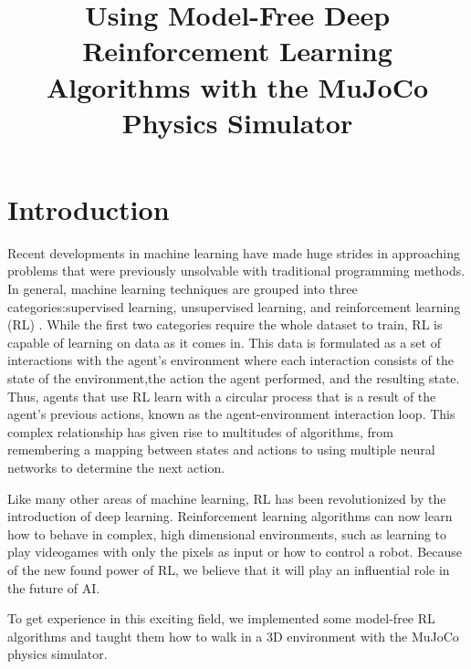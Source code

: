 \documentclass[conference]{IEEEtran}
\begin{document}
\title{Using Model-Free Deep Reinforcement Learning Algorithms with the MuJoCo Physics Simulator}

\author{
    \and
}
\maketitle

\begin{abstract}
    \blindtext
\end{abstract}

\section{Introduction}

Recent developments in machine learning have made huge strides in approaching problems that were previously unsolvable with traditional programming methods. In general, machine learning techniques are grouped into three categories:supervised learning, unsupervised learning, and reinforcement learning (RL) \cite{rl_application}. While the first two categories require the whole dataset to train, RL is capable of learning on data as it comes in. This data is formulated as a set of interactions with the agent's environment where each interaction consists of the state of the environment,the action the agent performed, and the resulting state. Thus, agents that use RL learn with a circular process that is a result of the agent's previous actions, known as the agent-environment interaction loop. This complex relationship has given rise to multitudes of algorithms, from remembering a mapping between states and actions to using multiple neural networks to determine the next action.

Like many other areas of machine learning, RL has been revolutionized by the introduction of deep learning. Reinforcement learning algorithms can now learn how to behave in complex, high dimensional environments, such as learning to play videogames with only the pixels as input or how to control a robot. Because of the new found power of RL, we believe that it will play an influential role in the future of AI.

To get experience in this exciting field, we implemented some model-free RL algorithms and taught them how to walk in a 3D environment with the MuJoCo physics simulator.
\end{document}
